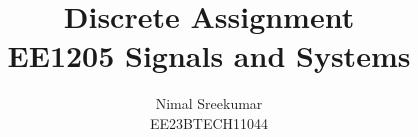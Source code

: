 \documentclass[a4,12pt,onecolumn]{IEEEtran}
\begin{document}
\let\vec\mathbf

\title{
\Huge\textbf{Discrete Assignment}\\
\Huge\textbf{EE1205} Signals and Systems\\
}
\large\author{Nimal Sreekumar\\EE23BTECH11044}

\maketitle



\bigskip

\renewcommand{\thefigure}{\theenumi}
\renewcommand{\thetable}{\theenumi}
\end{document}

